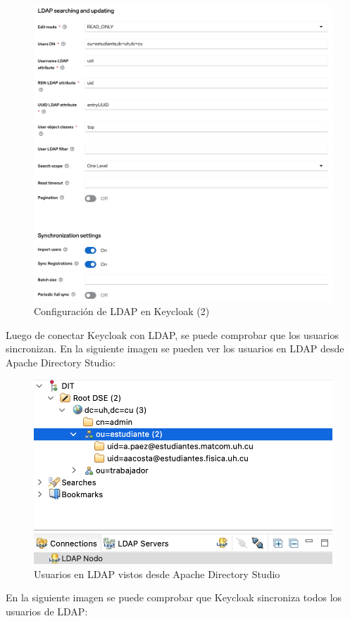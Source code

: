 \begin{enumerate}
		\begin{figure}[H]
		\centering
		\includegraphics[width=0.9\linewidth]{Graphics/keycloak_configuracion_ldap2}
		\caption{Configuración de LDAP en Keycloak (2)}
		\label{fig:keycloakconfiguracionldap1}
	\end{figure}

	Luego de conectar Keycloak con LDAP, se puede comprobar que los usuarios sincronizan. En la siguiente imagen se pueden ver los usuarios en LDAP desde Apache Directory Studio:
	
	\begin{figure}[H]
		\centering
		\includegraphics[width=0.7\linewidth]{Graphics/ADS_usuarios}
		\caption{Usuarios en LDAP vistos desde Apache Directory Studio}
		\label{fig:adsusuarios}
	\end{figure}

	En la siguiente imagen se puede comprobar que Keycloak sincroniza todos los usuarios de LDAP:
	

\end{enumerate}
